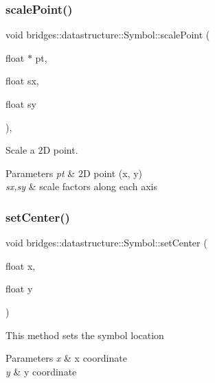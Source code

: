 \subsubsection{\texorpdfstring{scalePoint()}{scalePoint()}}
{\footnotesize\ttfamily void bridges\+::datastructure\+::\+Symbol\+::scale\+Point (\begin{DoxyParamCaption}\item[{float $\ast$}]{pt,  }\item[{float}]{sx,  }\item[{float}]{sy }\end{DoxyParamCaption})\hspace{0.3cm}{\ttfamily [inline]}, {\ttfamily [protected]}}



Scale a 2D point. 


\begin{DoxyParams}{Parameters}
{\em pt} & 2D point (x, y) \\
\hline
{\em sx,sy} & scale factors along each axis \\
\hline
\end{DoxyParams}
\mbox{\label{classbridges_1_1datastructure_1_1_symbol_a98a1c3d133e7fe2150d933495e421760}} 
\subsubsection{\texorpdfstring{setCenter()}{setCenter()}}
{\footnotesize\ttfamily void bridges\+::datastructure\+::\+Symbol\+::set\+Center (\begin{DoxyParamCaption}\item[{float}]{x,  }\item[{float}]{y }\end{DoxyParamCaption})\hspace{0.3cm}{\ttfamily [inline]}}

This method sets the symbol location


\begin{DoxyParams}{Parameters}
{\em x} & x coordinate \\
\hline
{\em y} & y coordinate \\
\hline
\end{DoxyParams}
\mbox{\label{classbridges_1_1datastructure_1_1_symbol_a3019a17458fe5f0381cfd611338af6f7}} 
